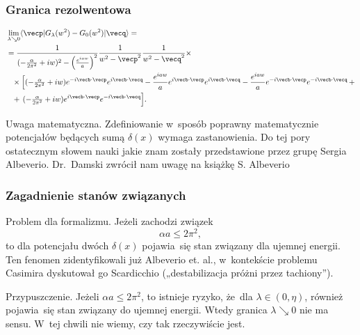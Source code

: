 \documentclass[10pt,t]{beamer}
\begin{document}
\begin{frame}
  \frametitle{Granica rezolwentowa}


  \begin{equation}
    \label{eq:Efekt-Casimira-35}
    \begin{split}
      &\lim_{ \lambda \searrow 0 }\langle \vecp | G_{ \lambda }( w^{ 2 } ) - G_{ 0 }( w^{ 2 } )
        | \vecq \rangle
        = \\
      &= \frac{ 1 }{ ( -\tfrac{ \alpha } { 2 \pi^{ 2 } } + iw )^{ 2 }
        - \left( \tfrac{ e^{ i aw } }{ a } \right)^{ 2 } }
        \frac{ 1 }{ w^{ 2 } - \vecp^{ 2 } }
        \frac{ 1 }{ w^{ 2 } - \vecq^{ 2 } } \times \\
      &\hphantom{=}
        \times \Big[ ( -\tfrac{ \alpha }{ 2 \pi^{ 2 } } + i w ) e^{ -i \vecb \cdot \vecp }
        e^{ i \vecb \cdot \vecq }
        - \frac{ e^{ i aw } }{ a } e^{ i \vecb \cdot \vecp }
        e^{ i \vecb \cdot \vecq } -\frac{ e^{ i aw } }{ a } e^{ -i \vecb \cdot \vecp }
        e^{ -i \vecb \cdot \vecq } \, + \\
      &\hphantom{=}
        + \, ( -\tfrac{ \alpha }{ 2 \pi^{ 2 } } + i w ) e^{ i \vecb \cdot \vecp }
        e^{ -i \vecb \cdot \vecq } \Big].
    \end{split}
  \end{equation}

  Uwaga matematyczna. Zdefiniowanie w~sposób poprawny matematycznie
  potencjałów będących sumą $\delta( x )$ wymaga zastanowienia. Do tej pory
  ostatecznym słowem nauki jakie znam zostały przedstawione przez grupę
  Sergia Albeverio. Dr.~Damski zwrócił nam uwagę na książkę S. Albeverio

\end{frame}





\begin{frame}
  \frametitle{Zagadnienie stanów związanych}


  Problem dla formalizmu. Jeżeli zachodzi związek
  \begin{equation}
    \label{eq:Efekt-Casimira-36}
    \alpha a \leq 2 \pi^{ 2 },
  \end{equation}
  to dla potencjału dwóch $\delta( x )$ pojawia~się stan związany dla
  ujemnej energii. Ten fenomen zidentyfikowali już Albeverio et. al.,
  w~kontekście problemu Casimira dyskutował go Scardicchio
  („destabilizacja próżni przez tachiony”).

  Przypuszczenie. Jeżeli $\alpha a \leq 2 \pi^{ 2 }$, to istnieje ryzyko, że~dla
  $\lambda \in ( 0, \eta )$, również pojawia~się stan związany do ujemnej energii.
  Wtedy granica $\lambda \searrow 0$ nie ma sensu. W~tej chwili nie wiemy, czy tak
  rzeczywiście jest.

\end{frame}
\end{document}
